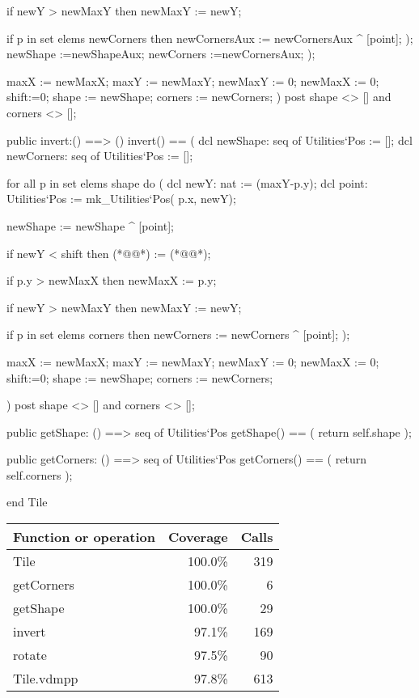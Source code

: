 \begin{vdm_al}
     if newY > newMaxY then
      newMaxY := newY;
     
     if p in set elems newCorners then
            newCornersAux := newCornersAux ^ [point];
             );
             newShape :=newShapeAux;
             newCorners :=newCornersAux;
            );
            
            maxX := newMaxX;
            maxY := newMaxY;
            newMaxY := 0;
            newMaxX := 0;
            shift:=0;
            shape := newShape;
            corners := newCorners;
        )
        post shape <> [] and corners <> [];
        
        public invert:() ==> ()
        invert() == (
         dcl newShape: seq of Utilities`Pos := [];
         dcl newCorners: seq of Utilities`Pos := [];
         
         for all p in set elems shape do (
          dcl newY: nat := (maxY-p.y);
          dcl point: Utilities`Pos := mk_Utilities`Pos( p.x, newY);
          
          newShape := newShape ^ [point];
          
          if newY < shift then
           (*@@*) := (*@@*);
          
                if p.y > newMaxX then
     newMaxX := p.y;
     
    if newY > newMaxY then
     newMaxY := newY;
    
    if p in set elems corners then
           newCorners := newCorners ^ [point];
            );
            
            maxX := newMaxX;
            maxY := newMaxY;
            newMaxY := 0;
            newMaxX := 0;
            shift:=0;
            shape := newShape;
            corners := newCorners;
         
        )
        post shape <> [] and corners <> [];

        public getShape: () ==> seq of Utilities`Pos
         getShape() == (
          return self.shape
         );
         
     public getCorners: () ==> seq of Utilities`Pos
         getCorners() == (
          return self.corners
         );
        
end Tile
\end{vdm_al}
\bigskip
\begin{longtable}{|l|r|r|}
\hline
Function or operation & Coverage & Calls \\
\hline
\hline
Tile & 100.0\% & 319 \\
\hline
getCorners & 100.0\% & 6 \\
\hline
getShape & 100.0\% & 29 \\
\hline
invert & 97.1\% & 169 \\
\hline
rotate & 97.5\% & 90 \\
\hline
\hline
Tile.vdmpp & 97.8\% & 613 \\
\hline
\end{longtable}


